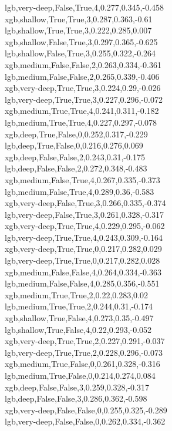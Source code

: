 lgb,very-deep,False,True,4,0.277,0.345,-0.458 \\
xgb,shallow,True,True,3,0.287,0.363,-0.61 \\
lgb,shallow,True,True,3,0.222,0.285,0.007 \\
xgb,shallow,False,True,3,0.297,0.365,-0.625 \\
lgb,shallow,False,True,3,0.255,0.322,-0.264 \\
xgb,medium,False,False,2,0.263,0.334,-0.361 \\
lgb,medium,False,False,2,0.265,0.339,-0.406 \\
xgb,very-deep,True,True,3,0.224,0.29,-0.026 \\
lgb,very-deep,True,True,3,0.227,0.296,-0.072 \\
xgb,medium,True,True,4,0.241,0.311,-0.182 \\
lgb,medium,True,True,4,0.227,0.297,-0.078 \\
xgb,deep,True,False,0,0.252,0.317,-0.229 \\
lgb,deep,True,False,0,0.216,0.276,0.069 \\
xgb,deep,False,False,2,0.243,0.31,-0.175 \\
lgb,deep,False,False,2,0.272,0.348,-0.483 \\
xgb,medium,False,True,4,0.267,0.335,-0.373 \\
lgb,medium,False,True,4,0.289,0.36,-0.583 \\
xgb,very-deep,False,True,3,0.266,0.335,-0.374 \\
lgb,very-deep,False,True,3,0.261,0.328,-0.317 \\
xgb,very-deep,True,True,4,0.229,0.295,-0.062 \\
lgb,very-deep,True,True,4,0.243,0.309,-0.164 \\
xgb,very-deep,True,True,0,0.217,0.282,0.029 \\
lgb,very-deep,True,True,0,0.217,0.282,0.028 \\
xgb,medium,False,False,4,0.264,0.334,-0.363 \\
lgb,medium,False,False,4,0.285,0.356,-0.551 \\
xgb,medium,True,True,2,0.22,0.283,0.02 \\
lgb,medium,True,True,2,0.244,0.31,-0.174 \\
xgb,shallow,True,False,4,0.273,0.35,-0.497 \\
lgb,shallow,True,False,4,0.22,0.293,-0.052 \\
xgb,very-deep,True,True,2,0.227,0.291,-0.037 \\
lgb,very-deep,True,True,2,0.228,0.296,-0.073 \\
xgb,medium,True,False,0,0.261,0.328,-0.316 \\
lgb,medium,True,False,0,0.214,0.274,0.084 \\
xgb,deep,False,False,3,0.259,0.328,-0.317 \\
lgb,deep,False,False,3,0.286,0.362,-0.598 \\
xgb,very-deep,False,False,0,0.255,0.325,-0.289 \\
lgb,very-deep,False,False,0,0.262,0.334,-0.362



